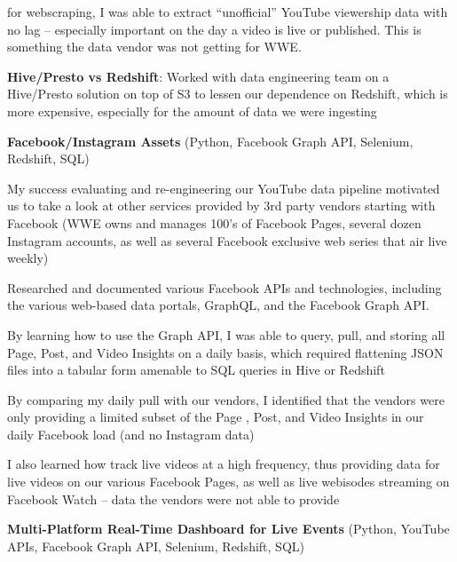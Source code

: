 \begin{itemize*}
\begin{itemize*}
        for webscraping, I was able to extract ``unofficial'' YouTube
        viewership data with no lag -- especially important on the day a
        video is live or published. This is something the data vendor was
        not getting for WWE.
      \item \textbf{Hive/Presto vs Redshift}: Worked with data
        engineering team on a Hive/Presto solution on top of S3 to
        lessen our dependence on Redshift, which is more expensive, 
        especially for the amount of data we were ingesting
    \end{itemize*}
  \item\leftandright
    {\textbf{Facebook/Instagram Assets}}
    {\small{(Python, Facebook Graph API, Selenium, Redshift, SQL)}}
    \begin{itemize*}
      \item My success evaluating and re-engineering our YouTube
        data pipeline motivated us to take a look at other services
        provided by 3rd party vendors starting with Facebook (WWE owns
        and manages 100's of Facebook Pages, several dozen Instagram
        accounts, as well as several Facebook
        exclusive web series that air live weekly)
      \item Researched and documented various Facebook APIs and
        technologies, including the various web-based data portals,
        GraphQL, and the Facebook Graph API.
      \item By learning how to use the Graph API, I was able to 
        query, pull, and storing all Page, Post, and Video Insights on a
        daily basis, which required flattening JSON files into a tabular
        form amenable to SQL queries in Hive or Redshift
      \item By comparing my daily pull with our vendors, I identified that 
        the vendors were only providing a limited subset of
        the Page , Post, and Video Insights in our daily Facebook load
        (and no Instagram data)
      \item I also learned how track live videos at a high frequency,
        thus providing data for live videos on our various Facebook
        Pages, as well as live webisodes streaming on Facebook Watch --
        data the vendors were not able to provide 
    \end{itemize*}
  \item\leftandright
    {\textbf{Multi-Platform Real-Time Dashboard for Live Events}}
    {\small{(Python, YouTube APIs, Facebook Graph API, Selenium, Redshift, SQL)}}

\end{itemize*}
